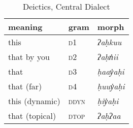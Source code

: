 \begin{table}[ht]
\centering
\caption{Deictics, Central Dialect}
\label{table:deictics}
\begin{tabular}{lll}
meaning                            & gram               & morph                                         \\ \hline
\multicolumn{1}{|l|}{this} & \multicolumn{1}{l|}{\textsc{d1}}   & \multicolumn{1}{l|}{\textit{ʔaḥkuu}}                   \\ \hline
\multicolumn{1}{|l|}{that by you} & \multicolumn{1}{l|}{\textsc{d2}}   & \multicolumn{1}{l|}{\textit{ʔaḥn̓ii}}                   \\ \hline
\multicolumn{1}{|l|}{that} & \multicolumn{1}{l|}{\textsc{d3}}   & \multicolumn{1}{l|}{\textit{ḥaay̓aḥi}}                   \\ \hline
\multicolumn{1}{|l|}{that (far)} & \multicolumn{1}{l|}{\textsc{d4}}   & \multicolumn{1}{l|}{\textit{ḥuuy̓aḥi}}                   \\ \hline
\multicolumn{1}{|l|}{this (dynamic)} & \multicolumn{1}{l|}{\textsc{ddyn}}   & \multicolumn{1}{l|}{\textit{ḥiy̓aḥi}}                   \\ \hline
\multicolumn{1}{|l|}{that (topical)} & \multicolumn{1}{l|}{\textsc{dtop}}   & \multicolumn{1}{l|}{\textit{ʔaḥʔaa}}                   \\ \hline
\end{tabular}
\end{table}